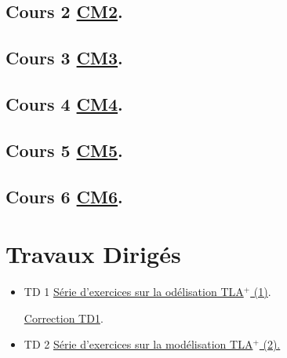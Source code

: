 \documentclass[ 12pt]{article}
\begin{document}
\begin{tcolorbox}
  
\subsection{Cours 2
  \href{http://mery54.github.io/teaching/mvsi/lecturesnotes/lectures-app-2024-cm2.pdf}{CM2}. }



\subsection{Cours 3
  \href{http://mery54.github.io/teaching/mvsi/lecturesnotes/lectures-app-2024-cm3.pdf}{CM3}. }



\subsection{Cours 4
  \href{http://mery54.github.io/teaching/mvsi/lecturesnotes/lectures-app-2024-cm4.pdf}{CM4}. }




\subsection{Cours 5
  \href{http://mery54.github.io/teaching/mvsi/lecturesnotes/lectures-app-2024-2.pdf}{CM5}. }




\subsection{Cours 6
  \href{http://mery54.github.io/teaching/mvsi/lecturesnotes/lectures-app-2024-3.pdf}{CM6}. }

  

\section{Travaux Dirigés}

  \begin{itemize}
  \item[]   TD 1 
    \href{http://mery54.github.io/teaching/mvsi/lecturesnotes/td1.pdf}{Série d'exercices sur la od\'elisation TLA$^+$  (1)}.

       \href{http://mery54.github.io/teaching/mvsi/lecturesnotes/ctd1.pdf}{Correction 
       TD1}.

       
  \item[]   TD 2 
    \href{http://mery54.github.io/teaching/mvsi/lecturesnotes/td2.pdf}{Série
      d'exercices sur la mod\'elisation TLA$^+$ (2).}   


\end{itemize}
\end{tcolorbox}
\end{document}
